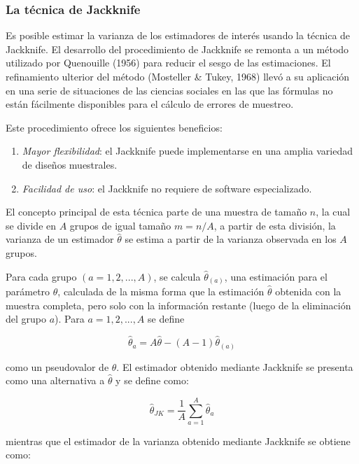 \documentclass[12pt,spanish,]{book}
\providecommand{\tightlist}{%
  \setlength{\itemsep}{0pt}\setlength{\parskip}{0pt}}
\begin{document}
\hypertarget{la-tecnica-de-jackknife}{%
\subsubsection*{La técnica de Jackknife}\label{la-tecnica-de-jackknife}}

Es posible estimar la varianza de los estimadores de interés usando la técnica de Jackknife. El desarrollo del procedimiento de Jackknife se remonta a un método utilizado por Quenouille (1956) para reducir el sesgo de las estimaciones. El refinamiento ulterior del método (Mosteller \& Tukey, 1968) llevó a su aplicación en una serie de situaciones de las ciencias sociales en las que las fórmulas no están fácilmente disponibles para el cálculo de errores de muestreo.

Este procedimiento ofrece los siguientes beneficios:

\begin{enumerate}
\def\labelenumi{\arabic{enumi}.}
\tightlist
\item
  \emph{Mayor flexibilidad}: el Jackknife puede implementarse en una amplia variedad de diseños muestrales.
\item
  \emph{Facilidad de uso}: el Jackknife no requiere de software especializado.
\end{enumerate}

El concepto principal de esta técnica parte de una muestra de tamaño \(n\), la cual se divide en \(A\) grupos de igual
tamaño \(m=n/A\), a partir de esta división, la varianza de un estimador \(\hat{\theta}\) se estima a partir de la varianza observada en los \(A\) grupos.

Para cada grupo \((a=1,2,...,A)\), se calcula \(\hat{\theta}_{(a)}\), una estimación para el parámetro \(\theta\), calculada de la misma forma que la estimación \(\hat{\theta}\) obtenida con la muestra completa, pero solo con la información restante (luego de la eliminación del grupo \(a\)). Para \(a=1,2,...,A\) se define

\[\hat{\theta}_{a}=A\hat{\theta}-(A-1)\hat{\theta}_{(a)}\]

como un pseudovalor de \(\theta\). El estimador obtenido mediante Jackknife se presenta como una alternativa a \(\hat{\theta}\) y se define como:

\[\hat{\theta}_{JK}=\dfrac{1}{A}\sum_{a=1}^{A}\hat{\theta}_{a}\]

mientras que el estimador de la varianza obtenido mediante Jackknife se obtiene como:
\end{document}
